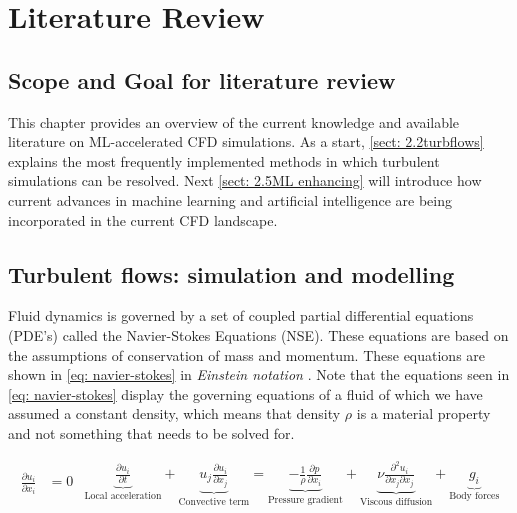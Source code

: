 \chapter{Literature Review}
\label{chap: 2}

\section{Scope and Goal for literature review}
\label{sect: 2.1scope}

This chapter provides an overview of the current knowledge and available literature on ML-accelerated CFD simulations. As a start, \autoref{sect: 2.2turbflows} explains the most frequently implemented methods in which turbulent simulations can be resolved. Next \autoref{sect: 2.5ML enhancing} will introduce how current advances in machine learning and artificial intelligence are being incorporated in the current CFD landscape.  

\section{Turbulent flows: simulation and modelling}
\label{sect: 2.2turbflows}

Fluid dynamics is governed by a set of coupled partial differential equations (PDE's) called the Navier-Stokes Equations (NSE). These equations are based on the assumptions of conservation of mass and momentum. These equations are shown in \ref{eq: navier-stokes} in \textit{Einstein notation} \cite{Turbulence}. Note that the equations seen in \ref{eq: navier-stokes} display the governing equations of a fluid of which we have assumed a constant density, which means that density $\rho$ is a material property and not something that needs to be solved for.

\begin{subequations} \label{eq: navier-stokes}

    \begin{equation} \label{eq: continuity}
    \begin{aligned}
    \frac{\partial u_i}{\partial x_i} &= 0
    \end{aligned}
    \end{equation}

    \begin{equation} \label{eq: momentum}
    \begin{aligned}
   \underbrace{ \frac{\partial u_i}{\partial t} }_{\text{Local acceleration}}
+ 
\underbrace{ u_j \frac{\partial u_i}{\partial x_j} }_{\text{Convective term}}
= 
\underbrace{ -\frac{1}{\rho} \frac{\partial p}{\partial x_i} }_{\text{Pressure gradient}}
+ 
\underbrace{ \nu \frac{\partial^2 u_i}{\partial x_j \partial x_j} }_{\text{Viscous diffusion}}
+ 
\underbrace{ g_i }_{\text{Body forces}}
    \end{aligned}
    \end{equation}
\end{subequations}

